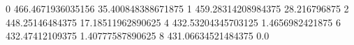 0 466.4671936035156 35.400848388671875
1 459.28314208984375 28.216796875
2 448.25146484375 17.18511962890625
4 432.53204345703125 1.4656982421875
6 432.47412109375 1.40777587890625
8 431.06634521484375 0.0
